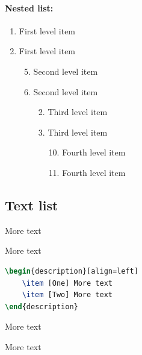 \documentclass{article}				%
\begin{document}
\paragraph{Nested list:}

\begin{enumerate}
	\item First level item
	\item First level item
	\begin{enumerate}
		\setcounter{enumii}{4} %
		\item Second level item
		\item Second level item
		\begin{enumerate}
			\setcounter{enumiii}{1} %
			\item Third level item
			\item Third level item
			\begin{enumerate}
				\setcounter{enumiv}{9} %
				\item Fourth level item
				\item Fourth level item
			\end{enumerate}
		\end{enumerate}
	\end{enumerate}
\end{enumerate}

\subsection{Text list}

\begin{description}[align=left]
	\item [One] More text
	\item [Two] More text
\end{description}

\begin{lstlisting}[language=tex,frame=single]
\begin{description}[align=left]
	\item [One] More text
	\item [Two] More text
\end{description}
\end{lstlisting}

\begin{description}[align=right]
	\item [One right] More text
	\item [Two right] More text
\end{description}
\end{document}
